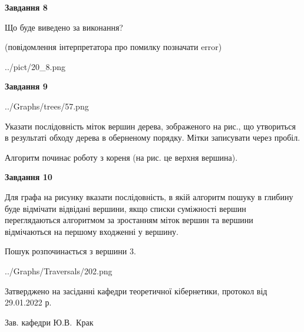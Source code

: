 \documentclass[12pt, ukrainian]{article}
\begin{document}
{\begin {large}
{\begin {center}\textbf{Завдання 8}\end {center}}\par
Що буде виведено за виконання?\par
 (повідомлення інтерпретатора про помилку позначати error)\par
\begin{center}
	{../pict/20_8.png}
\end{center}
\newpage

{\begin {center}\textbf{Завдання 9}\end {center}}\par

\begin{center}
	{../Graphs/trees/57.png}
\end{center}
Указати послідовність міток вершин дерева, зображеного на рис., що утвориться в результаті обходу дерева в оберненому порядку. Мітки записувати через пробіл.\par Алгоритм починає роботу з кореня (на рис. це верхня вершина).\par
\newpage

{\begin {center}\textbf{Завдання 10}\end {center}}\par
Для графа на рисунку вказати послідовність, в якій алгоритм пошуку в глибину буде відмічати відвідані вершини, якщо списки суміжності вершин переглядаються алгоритмом за зростанням міток вершин та вершини відмічаються на першому вход\-женні у вершину.\par
Пошук розпочинається з вершини 3.\par

\begin{center}
	{../Graphs/Traversals/202.png}
\end{center}\par
\newpage


\end {large}
}
{\smallskip \begin {small} Затверджено на засіданні кафедри теоретичної кібернетики, протокол  від   29.01.2022 р.\par\smallskip\smallskip
{\parbox {6.5 cm}{Зав. кафедри \dotfill Ю.В.~Крак}} \end{small}}
\end{document}
